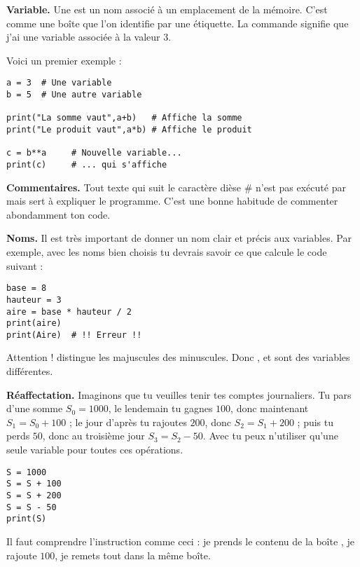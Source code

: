 \documentclass[11pt,class=report,crop=false]{standalone}
\begin{document}
\begin{cours}[Variables]


\textbf{Variable.} 
Une  est un nom associé à un emplacement de la mémoire. C'est comme une boîte que l'on identifie par une étiquette.
La commande \og{}\fg{} signifie que j'ai une variable \og{}\fg{} associée à la valeur $3$. 

Voici un premier exemple :
\begin{lstlisting}
a = 3  # Une variable
b = 5  # Une autre variable

print("La somme vaut",a+b)   # Affiche la somme
print("Le produit vaut",a*b) # Affiche le produit

c = b**a     # Nouvelle variable...
print(c)     # ... qui s'affiche
\end{lstlisting}


\medskip

\textbf{Commentaires.}
Tout texte qui suit le caractère dièse \og{}\#\fg{} n'est pas exécuté par \Python{} mais sert à expliquer le programme. C'est une bonne habitude de commenter abondamment ton code.

 
\medskip

\textbf{Noms.} 
Il est très important de donner un nom clair et précis aux variables. Par exemple, avec les noms bien choisis tu devrais savoir ce que calcule le code suivant :
\begin{lstlisting}
base = 8
hauteur = 3
aire = base * hauteur / 2
print(aire)
print(Aire)  # !! Erreur !!
\end{lstlisting}

Attention ! \Python{} distingue les majuscules des minuscules. Donc ,  et  sont des variables différentes.

\medskip

\textbf{Réaffectation.} Imaginons que tu veuilles tenir tes comptes journaliers. Tu pars d'une somme $S_0 = 1000$, le lendemain tu gagnes $100$, donc maintenant $S_1 = S_0 + 100$ ; le jour d'après tu rajoutes $200$, donc $S_2 = S_1 + 200$ ; puis tu perds $50$, donc au troisième jour $S_3 = S_2 - 50$. Avec \Python{} tu peux n'utiliser qu'une seule variable  pour toutes ces opérations.

\begin{lstlisting}
S = 1000
S = S + 100
S = S + 200
S = S - 50
print(S)
\end{lstlisting}
Il faut comprendre l'instruction \og{}\fg{} comme ceci : \og{}je prends le contenu de la boîte , je rajoute $100$, je remets tout dans la même boîte\fg{}.
\end{cours}
\end{document}
